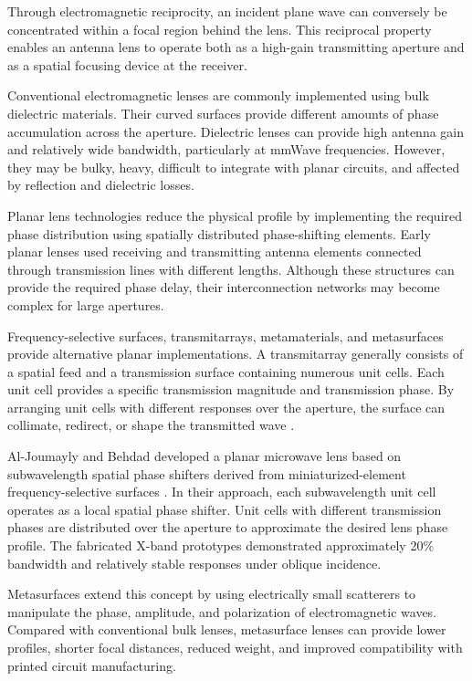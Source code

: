 Through electromagnetic reciprocity, an incident plane wave can
conversely be concentrated within a focal region behind the lens.
This reciprocal property enables an antenna lens to operate both as a
high-gain transmitting aperture and as a spatial focusing device at
the receiver.

Conventional electromagnetic lenses are commonly implemented using
bulk dielectric materials. Their curved surfaces provide different
amounts of phase accumulation across the aperture. Dielectric lenses
can provide high antenna gain and relatively wide bandwidth,
particularly at mmWave frequencies. However, they may be bulky,
heavy, difficult to integrate with planar circuits, and affected by
reflection and dielectric losses.

Planar lens technologies reduce the physical profile by implementing
the required phase distribution using spatially distributed
phase-shifting elements. Early planar lenses used receiving and
transmitting antenna elements connected through transmission lines
with different lengths. Although these structures can provide the
required phase delay, their interconnection networks may become
complex for large apertures.

Frequency-selective surfaces, transmitarrays, metamaterials, and
metasurfaces provide alternative planar implementations. A
transmitarray generally consists of a spatial feed and a transmission
surface containing numerous unit cells. Each unit cell provides a
specific transmission magnitude and transmission phase. By arranging
unit cells with different responses over the aperture, the surface can
collimate, redirect, or shape the transmitted wave
\cite{Song2026}.

Al-Joumayly and Behdad developed a planar microwave lens based on
subwavelength spatial phase shifters derived from miniaturized-element
frequency-selective surfaces \cite{Al-Joumayly2011}. In their
approach, each subwavelength unit cell operates as a local spatial
phase shifter. Unit cells with different transmission phases are
distributed over the aperture to approximate the desired lens phase
profile. The fabricated X-band prototypes demonstrated approximately
20\% bandwidth and relatively stable responses under oblique
incidence.

Metasurfaces extend this concept by using electrically small
scatterers to manipulate the phase, amplitude, and polarization of
electromagnetic waves. Compared with conventional bulk lenses,
metasurface lenses can provide lower profiles, shorter focal
distances, reduced weight, and improved compatibility with printed
circuit manufacturing.

